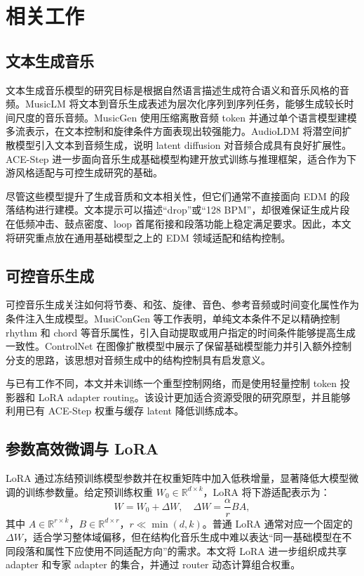 \documentclass[UTF8,a4paper,zihao=-4,fontset=none]{ctexart}
\begin{document}
\section{相关工作}

\subsection{文本生成音乐}

文本生成音乐模型的研究目标是根据自然语言描述生成符合语义和音乐风格的音频。MusicLM 将文本到音乐生成表述为层次化序列到序列任务，能够生成较长时间尺度的音乐音频。MusicGen 使用压缩离散音频 token 并通过单个语言模型建模多流表示，在文本控制和旋律条件方面表现出较强能力。AudioLDM 将潜空间扩散模型引入文本到音频生成，说明 latent diffusion 对音频合成具有良好扩展性。ACE-Step 进一步面向音乐生成基础模型构建开放式训练与推理框架，适合作为下游风格适配与可控生成研究的基础。

尽管这些模型提升了生成音质和文本相关性，但它们通常不直接面向 EDM 的段落结构进行建模。文本提示可以描述“drop”或“128 BPM”，却很难保证生成片段在低频冲击、鼓点密度、loop 首尾衔接和段落功能上稳定满足要求。因此，本文将研究重点放在通用基础模型之上的 EDM 领域适配和结构控制。

\subsection{可控音乐生成}

可控音乐生成关注如何将节奏、和弦、旋律、音色、参考音频或时间变化属性作为条件注入生成模型。MusiConGen 等工作表明，单纯文本条件不足以精确控制 rhythm 和 chord 等音乐属性，引入自动提取或用户指定的时间条件能够提高生成一致性。ControlNet 在图像扩散模型中展示了保留基础模型能力并引入额外控制分支的思路，该思想对音频生成中的结构控制具有启发意义。

与已有工作不同，本文并未训练一个重型控制网络，而是使用轻量控制 token 投影器和 LoRA adapter routing。该设计更加适合资源受限的研究原型，并且能够利用已有 ACE-Step 权重与缓存 latent 降低训练成本。

\subsection{参数高效微调与 LoRA}

LoRA 通过冻结预训练模型参数并在权重矩阵中加入低秩增量，显著降低大模型微调的训练参数量。给定预训练权重 $W_0 \in \mathbb{R}^{d \times k}$，LoRA 将下游适配表示为：
\begin{equation}
  W = W_0 + \Delta W,\quad \Delta W = \frac{\alpha}{r}BA,
\end{equation}
其中 $A \in \mathbb{R}^{r \times k}$，$B \in \mathbb{R}^{d \times r}$，$r \ll \min(d,k)$。普通 LoRA 通常对应一个固定的 $\Delta W$，适合学习整体域偏移，但在结构化音乐生成中难以表达“同一基础模型在不同段落和属性下应使用不同适配方向”的需求。本文将 LoRA 进一步组织成共享 adapter 和专家 adapter 的集合，并通过 router 动态计算组合权重。
\end{document}
